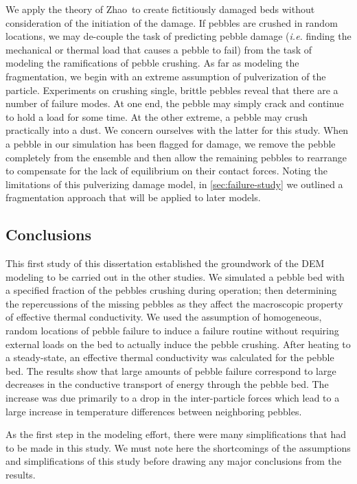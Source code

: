 We apply the theory of Zhao\etal~to create fictitiously damaged beds without consideration of the initiation of the damage. If pebbles are crushed in random locations, we may de-couple the task of predicting pebble damage (\textit{i.e.} finding the mechanical or thermal load that causes a pebble to fail) from the task of modeling the ramifications of pebble crushing. As far as modeling the fragmentation, we begin with an extreme assumption of pulverization of the particle. Experiments on crushing single, brittle pebbles reveal that there are a number of failure modes\cite{Wu2004}. At one end, the pebble may simply crack and continue to hold a load for some time. At the other extreme, a pebble may crush practically into a dust. We concern ourselves with the latter for this study. When a pebble in our simulation has been flagged for damage, we remove the pebble completely from the ensemble and then allow the remaining pebbles to rearrange to compensate for the lack of equilibrium on their contact forces. Noting the limitations of this pulverizing damage model, in \cref{sec:failure-study} we outlined a fragmentation approach that will be applied to later models.



\subsection{Conclusions}
\label{sec:dem-conclusions}
This first study of this dissertation established the groundwork of the DEM modeling to be carried out in the other studies. We simulated a pebble bed with a specified fraction of the pebbles crushing during operation; then determining the repercussions of the missing pebbles as they affect the macroscopic property of effective thermal conductivity. We used the assumption of homogeneous, random locations of pebble failure to induce a failure routine without requiring external loads on the bed to actually induce the pebble crushing. After heating to a steady-state, an effective thermal conductivity was calculated for the pebble bed. The results show that large amounts of pebble failure correspond to large decreases in the conductive transport of energy through the pebble bed. The increase was due primarily to a drop in the inter-particle forces which lead to a large increase in temperature differences between neighboring pebbles.

As the first step in the modeling effort, there were many simplifications that had to be made in this study. We must note here the shortcomings of the assumptions and simplifications of this study before drawing any major conclusions from the results.

